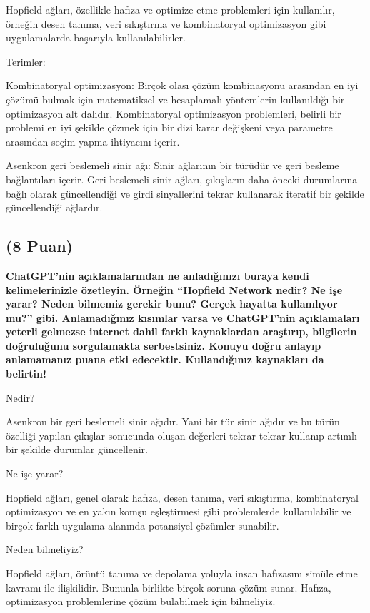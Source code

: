 \documentclass[11pt]{article}
\begin{document}
Hopfield ağları, özellikle hafıza ve optimize etme problemleri için kullanılır, örneğin desen tanıma, veri sıkıştırma ve kombinatoryal optimizasyon gibi uygulamalarda başarıyla kullanılabilirler.

Terimler:

Kombinatoryal optimizasyon: Birçok olası çözüm kombinasyonu arasından en iyi çözümü bulmak için matematiksel ve hesaplamalı yöntemlerin kullanıldığı bir optimizasyon alt dalıdır. Kombinatoryal optimizasyon problemleri, belirli bir problemi en iyi şekilde çözmek için bir dizi karar değişkeni veya parametre arasından seçim yapma ihtiyacını içerir.

Asenkron geri beslemeli sinir ağı: Sinir ağlarının bir türüdür ve geri besleme bağlantıları içerir. Geri beslemeli sinir ağları, çıkışların daha önceki durumlarına bağlı olarak güncellendiği ve girdi sinyallerini tekrar kullanarak iteratif bir şekilde güncellendiği ağlardır.

\subsection{(8 Puan)} \textbf{ChatGPT’nin açıklamalarından ne anladığınızı buraya kendi kelimelerinizle özetleyin. Örneğin ``Hopfield Network nedir? Ne işe yarar? Neden bilmemiz gerekir bunu? Gerçek hayatta kullanılıyor mu?'' gibi. Anlamadığınız kısımlar varsa ve ChatGPT’nin açıklamaları yeterli gelmezse internet dahil farklı kaynaklardan araştırıp, bilgilerin doğruluğunu sorgulamakta serbestsiniz. Konuyu doğru anlayıp anlamamanız puana etki edecektir. Kullandığınız kaynakları da belirtin!}

Nedir?

Asenkron bir geri beslemeli sinir ağıdır. Yani bir tür sinir ağıdır ve bu türün özelliği yapılan çıkışlar sonucunda oluşan değerleri tekrar tekrar kullanıp artımlı bir şekilde durumlar güncellenir.

Ne işe yarar?

Hopfield ağları, genel olarak hafıza, desen tanıma, veri sıkıştırma, kombinatoryal optimizasyon ve en yakın komşu eşleştirmesi gibi problemlerde kullanılabilir ve birçok farklı uygulama alanında potansiyel çözümler sunabilir.

Neden bilmeliyiz?

Hopfield ağları, örüntü tanıma ve depolama yoluyla insan hafızasını simüle etme kavramı ile ilişkilidir. Bununla birlikte birçok soruna çözüm sunar. Hafıza, optimizasyon problemlerine çözüm bulabilmek için bilmeliyiz.
\end{document}
